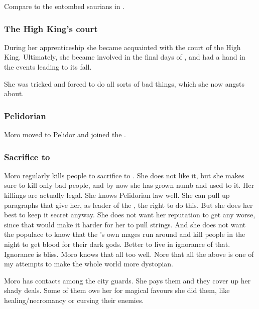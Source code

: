 Compare to the entombed saurians in \cite{Nile:InTheirDarkenesShrines}. 







\subsubsection{The High King's court}
During her apprenticeship she became acquainted with the court of the \Velcadian{} High King. Ultimately, she became involved in the final days of \GreatVelcad, and had a hand in the events leading to its fall. 

She was tricked and forced to do all sorts of bad things, which she now angsts about.





\subsubsection{Pelidorian \ishrah}
Moro moved to Pelidor and joined the \ishrah. 





\subsubsection{Sacrifice to \Nasshikerr}
Moro regularly kills people to sacrifice to .
She does not like it, but she makes sure to kill only bad people, and by now she has grown numb and used to it.
Her killings are actually legal.
She knows Pelidorian law well. 
She can pull up paragraphs that give her, as leader of the \ishrah, the right to do this.
But she does her best to keep it secret anyway.
She does not want her reputation to get any worse, since that would make it harder for her to pull strings.
And she does not want the populace to know that the \rayuth's own \ishrah mages run around and kill people in the night to get blood for their dark gods.
Better to live in ignorance of that.
Ignorance is bliss.
Moro knows that all too well.
Nore that all the above is one of my attempts to make the whole world more dystopian.

Moro has contacts among the city guards.
She pays them and they cover up her shady deals.
Some of them owe her for magical favours she did them, like healing/necromancy or cursing their enemies.





